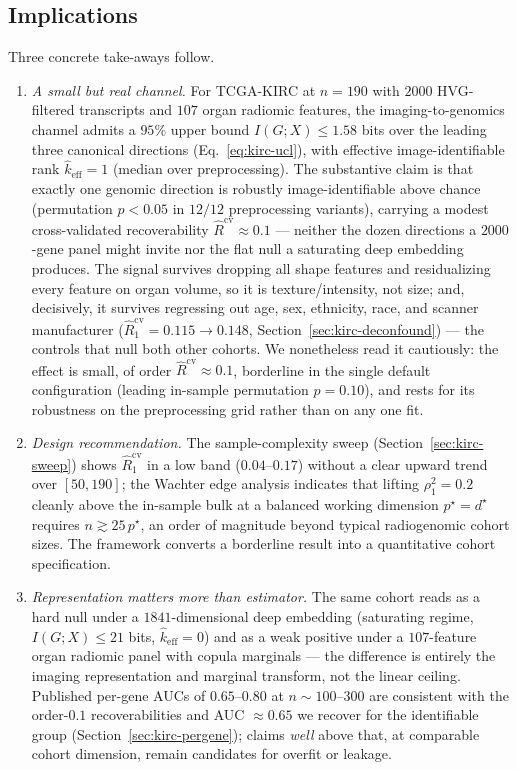 \documentclass{article}
\begin{document}
\subsection{Implications}
\label{sec:kirc-implications}
Three concrete take-aways follow.
\begin{enumerate}
\item \emph{A small but real channel.} For TCGA-KIRC at $n = 190$ with
$2000$ HVG-filtered transcripts and $107$ organ radiomic features, the
imaging-to-genomics channel admits a $95\%$ upper bound
$I(G;X) \le 1.58$ bits over the leading three canonical directions
(Eq.~\ref{eq:kirc-ucl}), with effective image-identifiable rank
$\hat k_{\mathrm{eff}} = 1$ (median over preprocessing). The substantive claim
is that exactly one genomic direction is robustly image-identifiable above
chance (permutation $p < 0.05$ in $12/12$ preprocessing variants), carrying a
modest cross-validated recoverability $\hat R^{\mathrm{cv}} \approx 0.1$ ---
neither the dozen directions a $2000$-gene panel might invite nor the flat
null a saturating deep embedding produces. The signal survives dropping all
shape features and residualizing every feature on organ volume, so it is
texture/intensity, not size; and, decisively, it survives regressing out age,
sex, ethnicity, race, and scanner manufacturer
($\hat R_1^{\mathrm{cv}} = 0.115\to0.148$, Section~\ref{sec:kirc-deconfound}) ---
the controls that null both other cohorts. We nonetheless read it cautiously: the
effect is small, of order $\hat R^{\mathrm{cv}}\approx 0.1$, borderline in the
single default configuration (leading in-sample permutation $p=0.10$), and rests
for its robustness on the preprocessing grid rather than on any one fit.
\item \emph{Design recommendation.} The sample-complexity sweep
(Section~\ref{sec:kirc-sweep}) shows $\hat R_1^{\mathrm{cv}}$ in a low band
($0.04$--$0.17$) without a clear upward trend over $[50, 190]$; the Wachter
edge analysis indicates that lifting $\rho_1^2 = 0.2$ cleanly above the
in-sample bulk at a balanced working dimension $p^\star = d^\star$ requires
$n \gtrsim 25\,p^\star$, an order of magnitude beyond typical radiogenomic
cohort sizes. The framework converts a borderline result into a quantitative
cohort specification.
\item \emph{Representation matters more than estimator.} The same cohort reads
as a hard null under a $1841$-dimensional deep embedding (saturating regime,
$I(G;X)\le 21$ bits, $\hat k_{\mathrm{eff}}=0$) and as a weak positive under a
$107$-feature organ radiomic panel with copula marginals --- the difference is
entirely the imaging representation and marginal transform, not the linear
ceiling. Published per-gene AUCs of $0.65$--$0.80$ at $n \sim 100$--$300$
\citep{jamshidi2015ccrcc,udayakumar2024radiogenomic,gevaert2012nsclc,bi2019ai,hosny2018ai}
are consistent with the order-$0.1$ recoverabilities and AUC $\approx 0.65$ we
recover for the identifiable group (Section~\ref{sec:kirc-pergene}); claims
\emph{well} above that, at comparable cohort dimension, remain candidates for
overfit or leakage.
\end{enumerate}
\end{document}
